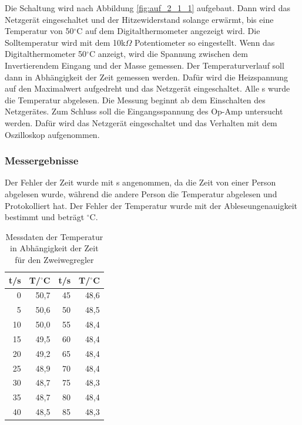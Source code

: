 \documentclass[12pt,a4paper]{article}
\begin{document}
Die Schaltung wird nach Abbildung \ref{fig:auf_2_1_1} aufgebaut. Dann wird das Netzgerät eingeschaltet und der Hitzewiderstand solange erwärmt, bis eine Temperatur von 50$^\circ$C auf dem Digitalthermometer angezeigt wird. Die Solltemperatur wird mit dem 10k$\Omega$ Potentiometer so eingestellt. Wenn das Digitalthermometer 50$^\circ$C anzeigt, wird die Spannung zwischen dem Invertierendem Eingang und der Masse gemessen. Der Temperaturverlauf soll dann in Abhängigkeit der Zeit gemessen werden. Dafür wird die Heizspannung auf den Maximalwert aufgedreht und das Netzgerät eingeschaltet. Alle \unit[5]{s} wurde die Temperatur abgelesen. Die Messung beginnt ab dem Einschalten des Netzgerätes. Zum Schluss soll die Eingangsspannung des Op-Amp untersucht werden. Dafür wird das Netzgerät eingeschaltet und das Verhalten mit dem Oszilloskop aufgenommen.

\subsubsection*{Messergebnisse}

Der Fehler der Zeit wurde mit \unit[0,5]{s} angenommen, da die Zeit von einer Person abgelesen wurde, während die andere Person die Temperatur abgelesen und Protokolliert hat. Der Fehler der Temperatur wurde mit der Ableseungenauigkeit bestimmt und beträgt \unit[0,1]{$^\circ$C}.

\begin{table}[htbp]
\centering
\begin{tabular}{||r|r||r|r||}

t/s & T/$^\circ$C & t/s & T/$^\circ$C \\ \hline
0 & 50,7 & 45 & 48,6 \\ 
5 & 50,6 & 50 & 48,5 \\ 
10 & 50,0 & 55 & 48,4 \\ 
15 & 49,5 & 60 & 48,4 \\ 
20 & 49,2 & 65 & 48,4 \\ 
25 & 48,9 & 70 & 48,4 \\ 
30 & 48,7 & 75 & 48,3 \\ 
35 & 48,7 & 80 & 48,4 \\ 
40 & 48,5 & 85 & 48,3 \\ 
\end{tabular}
\caption{Messdaten der Temperatur in Abhängigkeit der Zeit für den Zweiwegregler}
\label{tab:2_1}
\end{table}
\end{document}
